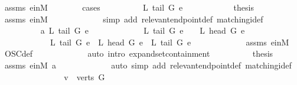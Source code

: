 \begin{isabellebody}
\ assms\ e{\isacharunderscore}inM\isanewline
\ \ \ \ \ \ \isamarkupfalse%
\ cases\isanewline
\ \ \ \ \ \ \ \ \isamarkupfalse%
\ {\isachardoublequoteopen}L\ {\isacharparenleft}tail\ G\ e{\isacharparenright}\ {\isacharequal}\ {}{\isachardoublequoteclose}\isanewline
\ \ \ \ \ \ \ \ \isamarkupfalse%
\ {\isacharquery}thesis\ \isamarkupfalse%
\ assms\ e{\isacharunderscore}inM\ \isanewline
\ \ \ \ \ \ \ \ \ \ \isamarkupfalse%
\ {\isacharparenleft}simp\ add{\isacharcolon}\ relevant{\isacharunderscore}endpoint{\isacharunderscore}def\ matching{\isacharunderscore}i{\isacharunderscore}def{\isacharparenright}\isanewline
\ \ \ \ \ \ \isamarkupfalse%
\isanewline
\ \ \ \ \ \ \ \ \isamarkupfalse%
\ a{\isacharcolon}\ {\isachardoublequoteopen}L\ {\isacharparenleft}tail\ G\ e{\isacharparenright}\ {\isasymnoteq}\ {}{\isachardoublequoteclose}\ \isanewline
\ \ \ \ \ \ \ \ \isamarkupfalse%
\ {\isachardoublequoteopen}L\ {\isacharparenleft}tail\ G\ e{\isacharparenright}\ {\isacharequal}\ {}\ {\isasymor}\ L\ {\isacharparenleft}head\ G\ e{\isacharparenright}\ {\isacharequal}\ {}\ \isanewline
\ \ \ \ \ \ \ \ \ \ {\isasymor}\ \ {\isacharparenleft}L\ {\isacharparenleft}tail\ G\ e{\isacharparenright}\ {\isacharequal}\ L\ {\isacharparenleft}head\ G\ e{\isacharparenright}\ {\isasymand}\ L\ {\isacharparenleft}tail\ G\ e{\isacharparenright}\ {\isachargreater}{}{\isacharparenright}{\isachardoublequoteclose}\isanewline
\ \ \ \ \ \ \ \ \ \ \isamarkupfalse%
\ assms\ e{\isacharunderscore}inM\ \isamarkupfalse%
\ OSC{\isacharunderscore}def\ \isanewline
\ \ \ \ \ \ \ \ \ \ \isamarkupfalse%
\ {\isacharparenleft}auto\ intro{\isacharcolon}\ expand{\isacharunderscore}set{\isacharunderscore}containment{\isacharparenright}\isanewline
\ \ \ \ \ \ \ \ \isamarkupfalse%
\ {\isacharquery}thesis\ \isamarkupfalse%
\ assms\ e{\isacharunderscore}inM\ a\ \isanewline
\ \ \ \ \ \ \ \ \ \ \isamarkupfalse%
\ {\isacharparenleft}auto\ simp\ add{\isacharcolon}\ relevant{\isacharunderscore}endpoint{\isacharunderscore}def\ matching{\isacharunderscore}i{\isacharunderscore}def{\isacharparenright}\isanewline
\ \ \ \ \ \ \isamarkupfalse%
\isanewline
\ \ \ \ \ \ \isamarkupfalse%
\ {}{\isacharcolon}\ {\isachardoublequoteopen}{\isacharquery}v\ {\isasymin}\ verts\ G{\isachardoublequoteclose}\ \isamarkupfalse%

\end{isabellebody}
